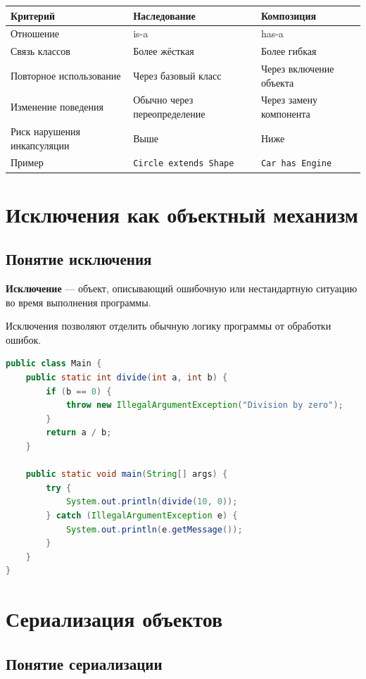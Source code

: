 \documentclass[12pt,a4paper]{article}
\begin{document}
\begin{longtable}{|p{5cm}|p{5cm}|p{5cm}|}
\hline
\textbf{Критерий} & \textbf{Наследование} & \textbf{Композиция} \\
\hline
Отношение & is-a & has-a \\
\hline
Связь классов & Более жёсткая & Более гибкая \\
\hline
Повторное использование & Через базовый класс & Через включение объекта \\
\hline
Изменение поведения & Обычно через переопределение & Через замену компонента \\
\hline
Риск нарушения инкапсуляции & Выше & Ниже \\
\hline
Пример & \texttt{Circle extends Shape} & \texttt{Car has Engine} \\
\hline
\end{longtable}

\section{Исключения как объектный механизм}

\subsection{Понятие исключения}

\textbf{Исключение} --- объект, описывающий ошибочную или нестандартную ситуацию во время выполнения программы.

Исключения позволяют отделить обычную логику программы от обработки ошибок.

\begin{lstlisting}[language=Java,caption={Исключения}]
public class Main {
    public static int divide(int a, int b) {
        if (b == 0) {
            throw new IllegalArgumentException("Division by zero");
        }
        return a / b;
    }

    public static void main(String[] args) {
        try {
            System.out.println(divide(10, 0));
        } catch (IllegalArgumentException e) {
            System.out.println(e.getMessage());
        }
    }
}
\end{lstlisting}

\section{Сериализация объектов}

\subsection{Понятие сериализации}
\end{document}
